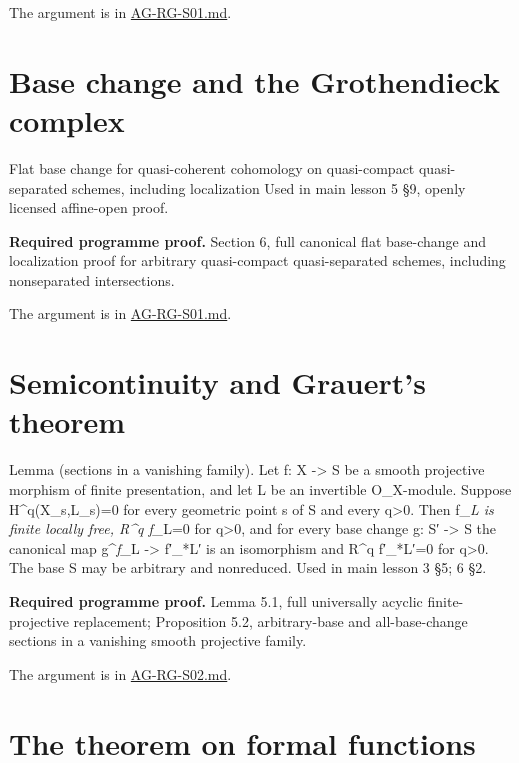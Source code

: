 \documentclass[11pt,a4paper,openany]{report}
\begin{document}
The argument is in \href{https://github.com/KokunoYumeto/open-math-courses/blob/main/docs/courses/AG-RG/AG-RG-S01.md}{AG-RG-S01.md}.

\section{Base change and the Grothendieck complex}\label{base-change-and-the-grothendieck-complex}

Flat base change for quasi-coherent cohomology on quasi-compact quasi-separated schemes, including localization Used in main lesson 5 §9, openly licensed affine-open proof.

\textbf{Required programme proof.} Section 6, full canonical flat base-change and localization proof for arbitrary quasi-compact quasi-separated schemes, including nonseparated intersections.

The argument is in \href{https://github.com/KokunoYumeto/open-math-courses/blob/main/docs/courses/AG-RG/AG-RG-S01.md}{AG-RG-S01.md}.

\section{Semicontinuity and Grauert's theorem}\label{semicontinuity-and-grauerts-theorem}

Lemma (sections in a vanishing family). Let f: X -\textgreater{} S be a smooth projective morphism of finite presentation, and let L be an invertible O\_X-module. Suppose H\^{}q(X\_s,L\_s)=0 for every geometric point s of S and every q\textgreater0. Then f\_\emph{L is finite locally free, R\^{}q f\_}L=0 for q\textgreater0, and for every base change g: S′ -\textgreater{} S the canonical map g\^{}\emph{f\_}L -\textgreater{} f′\_*L′ is an isomorphism and R\^{}q f′\_*L′=0 for q\textgreater0. The base S may be arbitrary and nonreduced. Used in main lesson 3 §5; 6 §2.

\textbf{Required programme proof.} Lemma 5.1, full universally acyclic finite-projective replacement; Proposition 5.2, arbitrary-base and all-base-change sections in a vanishing smooth projective family.

The argument is in \href{https://github.com/KokunoYumeto/open-math-courses/blob/main/docs/courses/AG-RG/AG-RG-S02.md}{AG-RG-S02.md}.

\section{The theorem on formal functions}\label{the-theorem-on-formal-functions}
\end{document}
